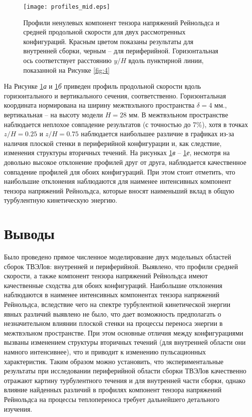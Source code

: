 \begin{figure}[h!]
  \centering
  \texttt{[image: profiles\_mid.eps]}
  \caption{Профили ненулевых компонент тензора напряжений Рейнольдса и средней продольной скорости для двух рассмотренных конфигураций. Красным цветом показаны результаты для внутренней сборки, черным -- для периферийной. Горизонтальная ось соответствует расстоянию $y/H$ вдоль пунктирной линии, показанной на Рисунке \ref{fig:4}}
  \label{fig:5}
\end{figure}


%
%
%
На Рисунке \ref{fig:5}\textit{а} и \ref{fig:5}\textit{б} приведен профиль продольной 
скорости вдоль горизонтального и вертикального сечения, соответственно.
%
Горизонтальная координата нормирована на ширину межтвэльного пространства 
$\delta = 4$ мм., вертикальная -- на высоту модели $H = 28$ мм.
%
В межтвэльном пространстве наблюдается неплохое совпадение результатов 
(с точностью до 7\%), хотя в точках $z/H = 0.25$ и $z/H = 0.75$ наблюдается наибольшее различие 
в графиках из-за наличия плоской стенки в периферийной конфигурации и, как следствие,
 изменения структуры вторичных течений.
%
На рисунках \ref{fig:5}\textit{в} -- \ref{fig:5}\textit{е}, 
несмотря на довольно высокое отклонение профилей друг от друга, 
наблюдается качественное совпадение профилей для обоих конфигураций.
%
При этом стоит отметить, что наибольшие отклонения наблюдаются для наименее интенсивных 
компонент тензора напряжений Рейнольдса, которые вносят наименьший вклад в общую турбулентную 
кинетическую энергию.





\section{Выводы}\label{ch4:conclusion}
%
Было проведено прямое численное моделирование двух модельных областей сборок ТВЭЛов: внутренней и периферийной. 
%
Выявлено, что профили средней скорости, а также компонент тензора напряжений 
Рейнольдса имеют качественные сходства для обоих конфигураций. 
%
Наибольшие отклонения наблюдаются в наименее интенсивных компонентах 
тензора напряжений Рейнольдса, вследствие чего на спектре турбулентной 
кинетической энергии явных различий выявлено не было,
 что дает возможность предполагать о незначительном влиянии плоской стенки на 
 процессы переноса энергии в межтвэльном пространстве. 
%
При этом основные отличия между конфигурациями вызваны изменением 
структуры вторичных течений (для внутренней области они намного интенсивнее), 
что и приводит к изменению пульсационных характеристик.
%
Таким образом можно установить, что экспериментальные результаты при 
исследовании периферийной области сборки ТВЭЛов качественно отражают картину 
турбулентного течения и для внутренней части сборки, однако влияние найденных различий
 в профилях компонент тензора напряжений Рейнольдса на процессы теплопереноса 
 требует дальнейшего детального изучения.

